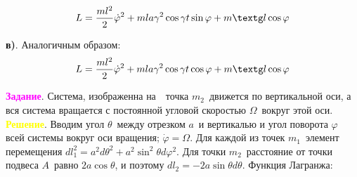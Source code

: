 {$$
L = \frac{ml^2}{2} \dot{\varphi}^2 + mla\gamma^2 \cos \gamma t
\sin \varphi + m\text{\textg}l \cos \varphi
$$

\noindent
\textbf{в)}. Аналогичным образом:
$$
L = \frac{ml^2}{2}\dot{\varphi}^2 + mla\gamma^2 \cos\gamma t
\cos\varphi + m\text{\textg}l\cos\varphi
$$

\noindent
\textcolor{magenta}{\textbf{Задание}}. Система, изображенна
на~\, точка $m_2$\, движется по вертикальной
оси, а вся система вращается с постоянной угловой скоростью $\Omega$\,
вокруг этой оси.\\

\noindent
\textcolor{yellow}{\textbf{Решение}}. Вводим угол $\theta$\, между
отрезком $a$\, и вертикалью и угол поворота $\varphi$\, всей системы
вокруг оси вращения; $\dot{\varphi}=\Omega$. Для каждой из точек $m_1$\,
элемент перемещения $dl^2_1 =a^2d\theta^2 + a^2\sin^2\theta d\varphi^2$.
Для точки $m_2$\, расстояние от точки подвеса $A$\, равно $2a\cos\theta$,
и поэтому $dl_2 = - 2a \sin \theta d\theta$. Функция Лагранжа:

\vglue 15pt

\begin{center}
\end{center}
}
